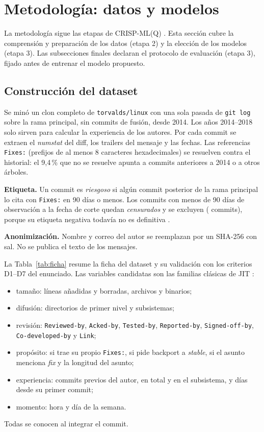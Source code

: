 \section{Metodología: datos y modelos}

La metodología sigue las etapas de CRISP-ML(Q) \cite{Studer2021}. Esta sección cubre la comprensión y preparación de los datos (etapa 2) y la elección de los modelos (etapa 3). Las subsecciones finales declaran el protocolo de evaluación (etapa 3), fijado antes de entrenar el modelo propuesto.

\subsection{Construcción del dataset}

Se minó un clon completo de \texttt{torvalds/linux} con una sola pasada de \texttt{git log} sobre la rama principal, sin commits de fusión, desde 2014. Los años 2014--2018 solo sirven para calcular la experiencia de los autores. Por cada commit se extraen el \emph{numstat} del diff, los trailers del mensaje y las fechas. Las referencias \texttt{Fixes:} (prefijos de al menos 8 caracteres hexadecimales) se resuelven contra el historial: el 9,4\,\% que no se resuelve apunta a commits anteriores a 2014 o a otros árboles.

\textbf{Etiqueta.} Un commit es \emph{riesgoso} si algún commit posterior de la rama principal lo cita con \texttt{Fixes:} en 90 días o menos. Los commits con menos de 90 días de observación a la fecha de corte quedan \emph{censurados} y se excluyen (\cifCensurados{} commits), porque su etiqueta negativa todavía no es definitiva \cite{Falessi2022,Cabral2019}.

\textbf{Anonimización.} Nombre y correo del autor se reemplazan por un SHA-256 con sal. No se publica el texto de los mensajes.

La Tabla~\ref{tab:ficha} resume la ficha del dataset y su validación con los criterios D1--D7 del enunciado. Las \cifNVariables{} variables candidatas son las familias clásicas de JIT \cite{Kamei2013}:
\begin{itemize}
\item tamaño: líneas añadidas y borradas, archivos y binarios;
\item difusión: directorios de primer nivel y subsistemas;
\item revisión: \texttt{Reviewed-by}, \texttt{Acked-by}, \texttt{Tested-by}, \texttt{Reported-by}, \texttt{Signed-off-by}, \texttt{Co-developed-by} y \texttt{Link};
\item propósito: si trae su propio \texttt{Fixes:}, si pide backport a \emph{stable}, si el asunto menciona \emph{fix} y la longitud del asunto;
\item experiencia: commits previos del autor, en total y en el subsistema, y días desde su primer commit;
\item momento: hora y día de la semana.
\end{itemize}
Todas se conocen al integrar el commit.

